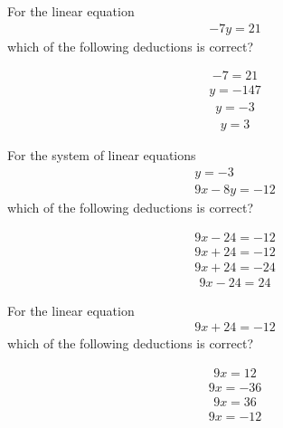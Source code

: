 \documentclass{webquiz}
\begin{document}
\begin{question} %
For the linear equation
\begin{gather*} 
-7y=21
\end{gather*}
which of the following deductions is correct?
\begin{choice}[columns=1] %
\incorrect
\begin{gather*} 
-7=21
\end{gather*}
\incorrect
\begin{gather*} 
y=-147
\end{gather*}
\correct
\begin{gather*} 
y=-3
\end{gather*}
\incorrect
\begin{gather*} 
y=3
\end{gather*}
\end{choice}
\end{question}




\begin{question} %
For the system of linear equations
\begin{gather*}
y=-3\\
9x-8y=-12
\end{gather*}
which of the following deductions is correct?
\begin{choice}[columns=1] %
\incorrect
\begin{gather*} 
9x-24=-12
\end{gather*}
\correct
\begin{gather*} 
9x+24=-12
\end{gather*}
\incorrect
\begin{gather*} 
9x+24=-24
\end{gather*}
\incorrect
\begin{gather*} 
9x-24=24
\end{gather*}
\end{choice}
\end{question}



\begin{question} %
For the linear equation
\begin{gather*} 
9x+24=-12
\end{gather*}
which of the following deductions is correct?
\begin{choice}[columns=1] %
\incorrect
\begin{gather*} 
9x=12
\end{gather*}
\correct
\begin{gather*} 
9x=-36
\end{gather*}
\incorrect
\begin{gather*} 
9x=36
\end{gather*}
\incorrect
\begin{gather*} 
9x=-12
\end{gather*}
\end{choice}
\end{question}
\end{document}

